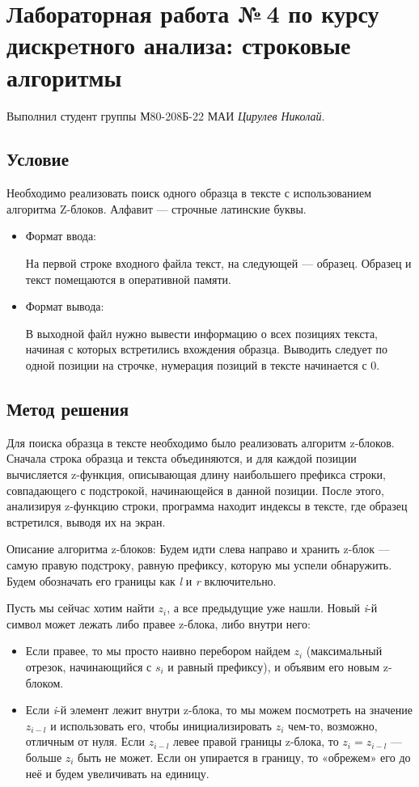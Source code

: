 \documentclass[12pt]{article}
\begin{document}
\section*{Лабораторная работа №\,4 по курсу дискрeтного анализа: строковые алгоритмы}

Выполнил студент группы М80-208Б-22 МАИ \textit{Цирулев Николай}.

\subsection*{Условие}

Необходимо реализовать поиск одного образца в тексте с использованием алгоритма Z-блоков. Алфавит — строчные латинские буквы. 
\begin{itemize}
\item
    Формат ввода:
    
    На первой строке входного файла текст, на следующей — образец. Образец и текст помещаются в оперативной памяти.

\item
    Формат вывода:
    
    В выходной файл нужно вывести информацию о всех позициях текста, начиная с которых встретились вхождения образца. Выводить следует по одной позиции на строчке, нумерация позиций в тексте начинается с 0. 
\end{itemize}

\subsection*{Метод решения}

Для поиска образца в тексте необходимо было реализовать алгоритм z-блоков. Сначала строка образца и текста объединяются, и для каждой позиции вычисляется z-функция, описывающая длину наибольшего префикса строки, совпадающего с подстрокой, начинающейся в данной позиции. После этого, анализируя z-функцию строки, программа находит индексы в тексте, где образец встретился, выводя их на экран.

Описание алгоритма z-блоков: Будем идти слева направо и хранить z-блок — самую правую подстроку, равную префиксу, которую мы успели обнаружить. Будем обозначать его границы как \textit{l} и \textit{r} включительно.

Пусть мы сейчас хотим найти $z_i$, а все предыдущие уже нашли. Новый \textit{i}-й символ может лежать либо правее z-блока, либо внутри него:
\begin{itemize}
\item
    Если правее, то мы просто наивно перебором найдем $z_i$ (максимальный отрезок, начинающийся с $s_i$ и равный префиксу), и объявим его новым z-блоком.
\item
    Если \textit{i}-й элемент лежит внутри z-блока, то мы можем посмотреть на значение $z_{i-l}$ и использовать его, чтобы инициализировать $z_i$ чем-то, возможно, отличным от нуля. Если $z_{i-l}$ левее правой границы z-блока, то $z_i=z_{i-l}$ — больше $z_i$ быть не может. Если он упирается в границу, то «обрежем» его до неё и будем увеличивать на единицу.
\end{itemize}
\end{document}
